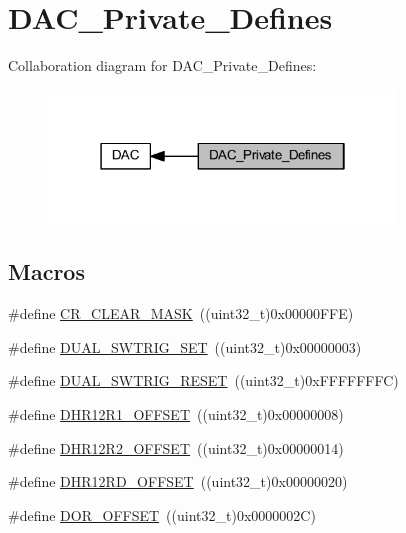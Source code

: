 \hypertarget{group___d_a_c___private___defines}{}\section{D\+A\+C\+\_\+\+Private\+\_\+\+Defines}
\label{group___d_a_c___private___defines}
Collaboration diagram for D\+A\+C\+\_\+\+Private\+\_\+\+Defines\+:
\nopagebreak
\begin{figure}[H]
\begin{center}
\leavevmode
\includegraphics[width=262pt]{group___d_a_c___private___defines}
\end{center}
\end{figure}
\subsection*{Macros}
\begin{DoxyCompactItemize}
\item 
\#define \hyperlink{group___d_a_c___private___defines_ga8a5812a1d5ced986bb997a4bb7ae697d}{C\+R\+\_\+\+C\+L\+E\+A\+R\+\_\+\+M\+A\+SK}~((uint32\+\_\+t)0x00000\+F\+F\+E)
\item 
\#define \hyperlink{group___d_a_c___private___defines_ga6401668f65168b2b689b49155f380bdd}{D\+U\+A\+L\+\_\+\+S\+W\+T\+R\+I\+G\+\_\+\+S\+ET}~((uint32\+\_\+t)0x00000003)
\item 
\#define \hyperlink{group___d_a_c___private___defines_gacd3ce00f8b25892532af267f26932ed7}{D\+U\+A\+L\+\_\+\+S\+W\+T\+R\+I\+G\+\_\+\+R\+E\+S\+ET}~((uint32\+\_\+t)0x\+F\+F\+F\+F\+F\+F\+F\+C)
\item 
\#define \hyperlink{group___d_a_c___private___defines_gaf1305e3b7cfb0f898678baeab6e91cbf}{D\+H\+R12\+R1\+\_\+\+O\+F\+F\+S\+ET}~((uint32\+\_\+t)0x00000008)
\item 
\#define \hyperlink{group___d_a_c___private___defines_ga157b0fbccea090637eea09172fdd6a39}{D\+H\+R12\+R2\+\_\+\+O\+F\+F\+S\+ET}~((uint32\+\_\+t)0x00000014)
\item 
\#define \hyperlink{group___d_a_c___private___defines_ga2893b0491ec29a95fd061e5e0fa029e3}{D\+H\+R12\+R\+D\+\_\+\+O\+F\+F\+S\+ET}~((uint32\+\_\+t)0x00000020)
\item 
\#define \hyperlink{group___d_a_c___private___defines_ga051bab7263211bd232d13665339c1745}{D\+O\+R\+\_\+\+O\+F\+F\+S\+ET}~((uint32\+\_\+t)0x0000002\+C)
\end{DoxyCompactItemize}


